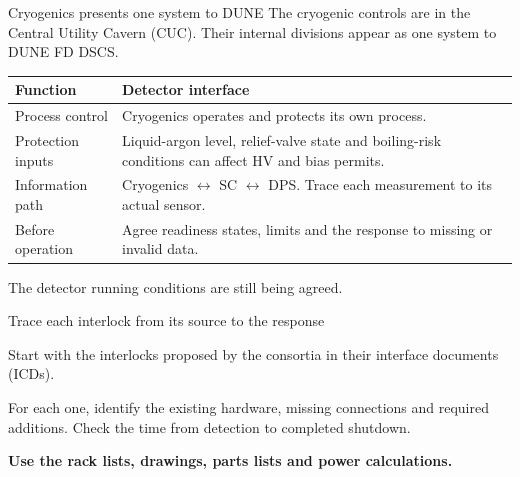 \documentclass[aspectratio=169,11pt]{beamer}
\begin{document}
\begin{frame}{Cryogenics presents one system to DUNE}
The cryogenic controls are in the Central Utility Cavern (CUC).
Their internal divisions appear as one system to DUNE FD DSCS.\par\bigskip
\renewcommand{\arraystretch}{1.3}
\begin{tabularx}{\textwidth}{@{}>{\RaggedRight\arraybackslash}p{3cm}>{\RaggedRight\arraybackslash}X@{}}
\toprule
\textbf{Function} & \textbf{Detector interface}\\\midrule
Process control & Cryogenics operates and protects its own process.\\
Protection inputs & Liquid-argon level, relief-valve state and boiling-risk conditions can affect HV and bias permits.\\
Information path & Cryogenics $\leftrightarrow$ SC $\leftrightarrow$ DPS. Trace each measurement to its actual sensor.\\
Before operation & Agree readiness states, limits and the response to missing or invalid data.\\
\bottomrule
\end{tabularx}\par\medskip
The detector running conditions are still being agreed.
\end{frame}

\begin{frame}{Trace each interlock from its source to the response}
\centering
{}\par\smallskip
\raggedright{}\par\smallskip
\raggedright

Start with the interlocks proposed by the consortia in their interface documents (ICDs).\par\bigskip
For each one, identify the existing hardware, missing connections and required additions. Check the time from detection to completed shutdown.\par\bigskip
\textbf{Use the rack lists, drawings, parts lists and power calculations.}
\end{frame}
\end{document}
